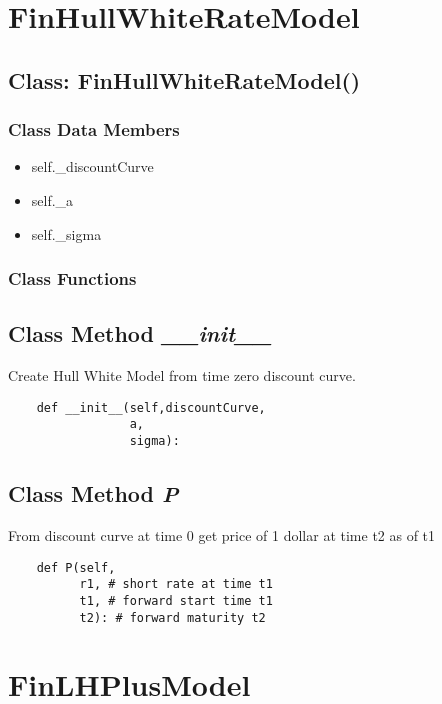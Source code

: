 \documentclass[twoside,11pt]{book}
\begin{document}
\newpage
\section{FinHullWhiteRateModel}

\subsection{Class: FinHullWhiteRateModel()}


\subsubsection{Class Data Members}
\begin{itemize}
\item{self.\_discountCurve}
\item{self.\_a}
\item{self.\_sigma}
\end{itemize}

\subsubsection{Class Functions}

\subsection{Class Method {\it \_\_init\_\_}}
Create Hull White Model from time zero discount curve. 

\begin{lstlisting}
    def __init__(self,discountCurve,
                 a,
                 sigma):
\end{lstlisting}

\subsection{Class Method {\it P}}
From discount curve at time 0 get price of 1 dollar at time t2 as of t1 

\begin{lstlisting}
    def P(self,
          r1, # short rate at time t1
          t1, # forward start time t1
          t2): # forward maturity t2
\end{lstlisting}

\newpage
\section{FinLHPlusModel}
\end{document}
